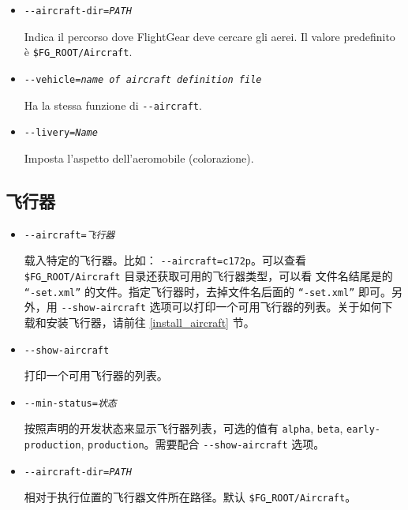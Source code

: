 \begin{itemize}
{\begin{itemize}
  \item{\texttt{-$ $-aircraft-dir={\it PATH}}}

  Indica il percorso dove FlightGear deve cercare gli aerei.
  Il valore predefinito \`{e} \texttt{\$FG\underline{~}ROOT/Aircraft}.

  \item{\texttt{-$ $-vehicle={\it name of aircraft definition file}}}

  Ha la stessa funzione di \texttt{-$ $-aircraft}.

  \item{\texttt{-$ $-livery={\it Name}}}

  Imposta l'aspetto dell'aeromobile (colorazione).

  \end{itemize}

}

\ifchinese
{
  \subsection{飞行器}
\begin{itemize}
\item{\texttt{-$ $-aircraft={\it 飞行器}}}
   
   载入特定的飞行器。比如： \texttt{-$ $-aircraft=c172p}。可以查看 \texttt{\$FG\underline{~}ROOT/Aircraft} 目录还获取可用的飞行器类型，可以看 文件名结尾是的 \texttt{``-set.xml''} 的文件。指定飞行器时，去掉文件名后面的 \texttt{``-set.xml''} 即可。另外，用 \texttt{-$ $-show-aircraft} 选项可以打印一个可用飞行器的列表。关于如何下载和安装飞行器，请前往 \ref{install_aircraft} 节。

\item{\texttt{-$ $-show-aircraft}}

  打印一个可用飞行器的列表。

\item{\texttt{-$ $-min-status={\it 状态}}}

  按照声明的开发状态来显示飞行器列表，可选的值有 \texttt{alpha}, \texttt{beta}, \texttt{early-production}, \texttt{production}。需要配合 \texttt{-$ $-show-aircraft} 选项。

\item{\texttt{-$ $-aircraft-dir={\it PATH}}}

  相对于执行位置的飞行器文件所在路径。默认 \texttt{\$FG\underline{~}ROOT/Aircraft}。


\end{itemize}}
\end{itemize}
